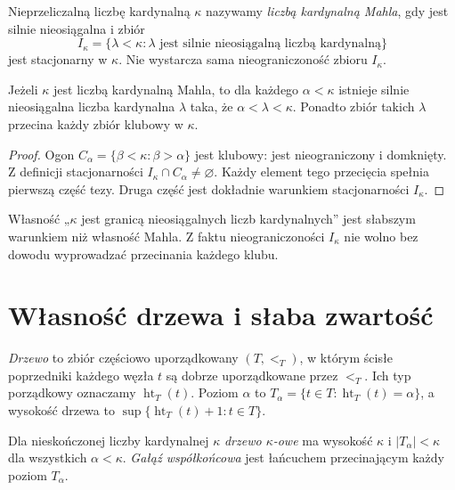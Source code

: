 \begin{definicja}\label{def:lc38-mahlo}
Nieprzeliczalną liczbę kardynalną $\kappa$
nazywamy \emph{liczbą kardynalną Mahla},
gdy jest silnie nieosiągalna i zbiór
\[
 I_\kappa=\{\lambda<\kappa:
      \lambda\text{ jest silnie nieosiągalną liczbą kardynalną}\}
\]
jest stacjonarny w $\kappa$.
Nie wystarcza sama nieograniczoność
zbioru $I_\kappa$.
\end{definicja}

\begin{twierdzenie}
\label{thm:lc38-mahlo-limit}
Jeżeli $\kappa$ jest liczbą kardynalną Mahla,
to dla każdego $\alpha<\kappa$
istnieje silnie nieosiągalna liczba kardynalna
$\lambda$ taka, że
$\alpha<\lambda<\kappa$.
Ponadto zbiór takich $\lambda$
przecina każdy zbiór klubowy w $\kappa$.
\end{twierdzenie}
\begin{proof}
Ogon $C_\alpha=\{\beta<\kappa:
\beta>\alpha\}$ jest klubowy:
jest nieograniczony i domknięty.
Z definicji stacjonarności
$I_\kappa\cap C_\alpha\ne\varnothing$.
Każdy element tego przecięcia
spełnia pierwszą część tezy.
Druga część jest dokładnie
warunkiem stacjonarności $I_\kappa$.
\end{proof}

\begin{uwaga}
\label{rem:lc38-mahlo-warning}
Własność „$\kappa$ jest granicą
nieosiągalnych liczb kardynalnych”
jest słabszym warunkiem niż
własność Mahla. Z faktu
nieograniczoności $I_\kappa$
nie wolno bez dowodu wyprowadzać
przecinania każdego klubu.
\end{uwaga}

\section{Własność drzewa i słaba zwartość}

\begin{definicja}
\label{def:lc38-tree}
\emph{Drzewo} to zbiór częściowo
uporządkowany $(T,<_{T})$,
w którym ścisłe poprzedniki
każdego węzła $t$ są dobrze
uporządkowane przez $<_{T}$.
Ich typ porządkowy oznaczamy
$\operatorname{ht}_T(t)$.
Poziom $\alpha$ to
$T_\alpha=\{t\in T:
                 \operatorname{ht}_T(t)=\alpha\}$,
a wysokość drzewa to
$\sup\{\operatorname{ht}_T(t)+1:t\in T\}$.

Dla nieskończonej liczby kardynalnej
$\kappa$ \emph{drzewo $\kappa$-owe}
ma wysokość $\kappa$ i
$|T_\alpha|<\kappa$ dla
wszystkich $\alpha<\kappa$.
\emph{Gałąź współkońcowa} jest
łańcuchem przecinającym
każdy poziom $T_\alpha$.
\end{definicja}

